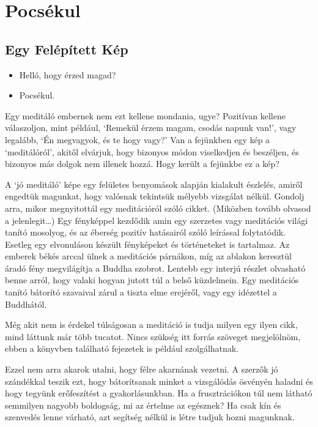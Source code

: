 \chapter{Pocsékul}

\section{Egy Felépített Kép}

\begin{itemize}
\tightlist
\item
  Helló, hogy érzed magad?
\item
  Pocsékul.
\end{itemize}

Egy meditáló embernek nem ezt kellene mondania, ugye? Pozitívan kellene
válaszoljon, mint például, `Remekül érzem magam, csodás napunk van!',
vagy legalább, `Én megvagyok, és te hogy vagy?' Van a fejünkben egy kép
a `meditálóról', akitől elvárjuk, hogy bizonyos módon viselkedjen és
beszéljen, és bizonyos más dolgok nem illenek hozzá. Hogy került a
fejünkbe ez a kép?

A `jó meditáló' képe egy felületes benyomások alapján kialakult
észlelés, amiről engedtük magunkat, hogy valósnak tekintsük mélyebb
vizsgálat nélkül. Gondolj arra, mikor megnyitottál egy meditációról
szóló cikket. (Miközben tovább olvasod a jelenlegit\ldots) Egy
fényképpel kezdődik amin egy szerzetes vagy meditációs világi tanító
mosolyog, és az éberség pozitív hatásairól szóló leírással folytatódik.
Esetleg egy elvonuláson készült fényképeket és történeteket is
tartalmaz. Az emberek békés arccal ülnek a meditációs párnákon, míg az
ablakon keresztül áradó fény megvilágítja a Buddha szobrot. Lentebb egy
interjú részlet olvasható benne arról, hogy valaki hogyan jutott túl a
belső küzdelmein. Egy meditációs tanító bátorító szavaival zárul a
tiszta elme erejéről, vagy egy idézettel a Buddhától.

Még akit nem is érdekel túlságosan a meditáció is tudja milyen egy ilyen
cikk, mind láttunk már több tucatot. Nincs szükség itt forrás szöveget
megjelölnöm, ebben a könyvben található fejezetek is például
szolgálhatnak.

Ezzel nem arra akarok utalni, hogy félre akarnának vezetni. A szerzők jó
szándékkal teszik ezt, hogy bátorítsanak minket a vizsgálódás ösvényén
haladni és hogy tegyünk erőfeszítést a gyakorlásunkban. Ha a
frusztrációkon túl nem látható semmilyen nagyobb boldogság, mi az
értelme az egésznek? Ha csak kín és szenvedés lenne várható, azt
segítség nélkül is létre tudjuk hozni magunknak.

